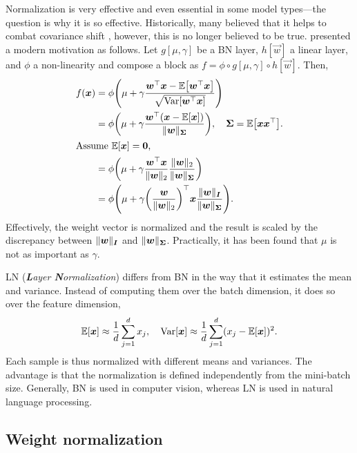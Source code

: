 Normalization is very effective and even essential in some model types---the question is why it is
so effective. Historically, many believed that it helps to combat covariance shift
\citep{ioffe2015batch}, however, this is no longer believed to be true. \citet{santurkar2018does}
presented a modern motivation as follows. Let $g[\mu, \gamma]$ be a BN layer, $h[\vec{w}]$ a linear
layer, and $\phi$ a non-linearity and compose a block as $f = \phi \circ g[\mu, \gamma] \circ
    h[\vec{w}]$. Then,
\begin{align*}
    f(\vec{x}) & = \phi \lft( \mu + \gamma \frac{\transpose{\vec{w}} \vec{x} - \E\lft[ \transpose{\vec{w}}\vec{x} \rgt]}{\sqrt{\Var\lft[ \transpose{\vec{w}}\vec{x} \rgt]}} \rgt)                   \\
               & = \phi \lft( \mu + \gamma \frac{\transpose{\vec{w}} (\vec{x} - \E[\vec{x}])}{\| \vec{w} \|_{\mat{\Sigma}}} \rgt), \quad \mat{\Sigma} = \E \lft[ \vec{x} \transpose{\vec{x}} \rgt]. \\
    \intertext{Assume $\E[\vec{x}] = \vec{0}$,}
               & = \phi \lft( \mu + \gamma \frac{\transpose{\vec{w}}\vec{x}}{\| \vec{w} \|_2} \frac{\| \vec{w} \|_2}{\| \vec{w} \|_{\mat{\Sigma}}} \rgt)                                            \\
               & = \phi \lft( \mu + \gamma \transpose{\lft( \frac{\vec{w}}{\| \vec{w} \|_2} \rgt)} \vec{x} \frac{\| \vec{w} \|_{\mat{I}}}{\| \vec{w} \|_{\mat{\Sigma}}} \rgt).
\end{align*}
Effectively, the weight vector is normalized and the result is scaled by the discrepancy between
$\| \bm{w} \|_{\bm{I}}$ and $\| \bm{w} \|_{\bm{\Sigma}}$. Practically, it has been found that $\mu$
is not as important as $\gamma$.

LN (\textit{\textbf{L}ayer \textbf{N}ormalization}) \citep{lei2016layer} differs from BN in the way
that it estimates the mean and variance. Instead of computing them over the batch dimension, it
does so over the feature dimension, \[
    \mathbb{E}[\bm{x}] \approx \frac{1}{d} \sum_{j=1}^{d} x_j, \quad \mathrm{Var}[\bm{x}] \approx \frac{1}{d} \sum_{j=1}^{d} (x_j - \mathbb{E}[\bm{x}])^2.
\]
Each sample is thus normalized with different means and variances. The advantage is that the
normalization is defined independently from the mini-batch size. Generally, BN is used in computer
vision, whereas LN is used in natural language processing.

\subsection{Weight normalization}

